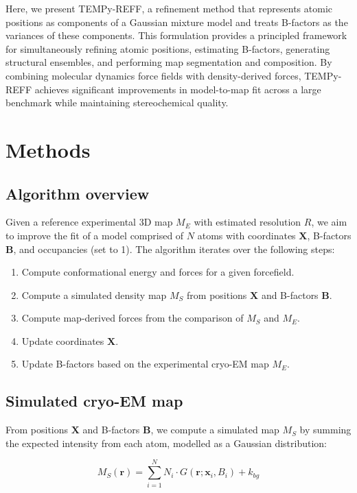 \documentclass[11pt]{article}
\begin{document}
Here, we present TEMPy-REFF, a refinement method that represents atomic positions as components of a Gaussian mixture model and treats B-factors as the variances of these components. This formulation provides a principled framework for simultaneously refining atomic positions, estimating B-factors, generating structural ensembles, and performing map segmentation and composition. By combining molecular dynamics force fields with density-derived forces, TEMPy-REFF achieves significant improvements in model-to-map fit across a large benchmark while maintaining stereochemical quality.

\section{Methods}

\subsection{Algorithm overview}

Given a reference experimental 3D map $M_E$ with estimated resolution $R$, we aim to improve the fit of a model comprised of $N$ atoms with coordinates $\mathbf{X}$, B-factors $\mathbf{B}$, and occupancies (set to 1). The algorithm iterates over the following steps:

\begin{enumerate}
    \item Compute conformational energy and forces for a given forcefield.
    \item Compute a simulated density map $M_S$ from positions $\mathbf{X}$ and B-factors $\mathbf{B}$.
    \item Compute map-derived forces from the comparison of $M_S$ and $M_E$.
    \item Update coordinates $\mathbf{X}$.
    \item Update B-factors based on the experimental cryo-EM map $M_E$.
\end{enumerate}

\subsection{Simulated cryo-EM map}

From positions $\mathbf{X}$ and B-factors $\mathbf{B}$, we compute a simulated map $M_S$ by summing the expected intensity from each atom, modelled as a Gaussian distribution:

\begin{equation}
M_S(\mathbf{r}) = \sum_{i=1}^{N} N_i \cdot G(\mathbf{r}; \mathbf{x}_i, B_i) + k_{bg}
\end{equation}
\end{document}
